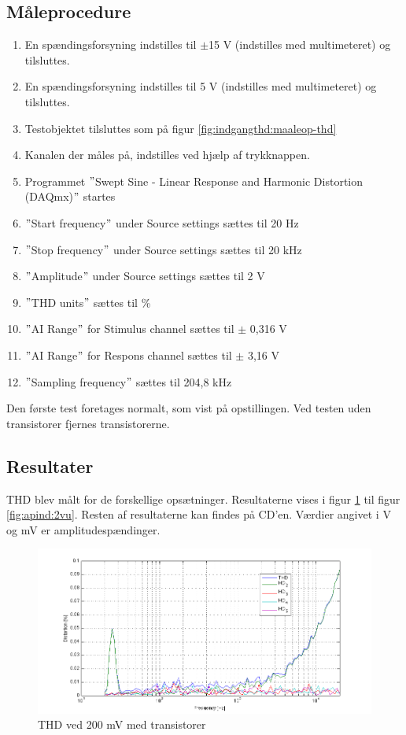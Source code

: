\subsection*{Måleprocedure}
\begin{enumerate}
\item En spændingsforsyning indstilles til $\pm$15 V (indstilles med multimeteret) og tilsluttes.
\item En spændingsforsyning indstilles til 5 V (indstilles med multimeteret) og tilsluttes.
\item Testobjektet tilsluttes som på figur \ref{fig:indgangthd:maaleop-thd}
\item Kanalen der måles på, indstilles ved hjælp af trykknappen.
\item Programmet $"$Swept Sine - Linear Response and Harmonic Distortion (DAQmx)$"$ startes
\item $"$Start frequency$"$ under Source settings sættes til 20 Hz
\item $"$Stop frequency$"$ under Source settings sættes til 20 kHz
\item $"$Amplitude$"$ under Source settings sættes til 2 V
\item $"$THD units$"$ sættes til \%
\item $"$AI Range$"$ for Stimulus channel sættes til $\pm$ 0,316 V
\item $"$AI Range$"$ for Respons channel sættes til $\pm$ 3,16 V
\item $"$Sampling frequency$"$ sættes til 204,8 kHz
\end{enumerate}

Den første test foretages normalt, som vist på opstillingen. Ved testen uden transistorer fjernes transistorerne.	

\subsection*{Resultater}

THD blev målt for de forskellige opsætninger. Resultaterne vises i figur \ref{fig:apind:200mvm} til figur \ref{fig:apind:2vu}. Resten af resultaterne kan findes på CD'en. Værdier angivet i V og mV er amplitudespændinger.

\begin{figure}[h]
\centering
\includegraphics[width=\textwidth]{maalerapporter/indgangsvaelger/maalinger/opa/mic-200mv-opa-muxudgang-thd.png}
\caption{THD ved 200 mV med transistorer}
\label{fig:apind:200mvm}
\end{figure}


